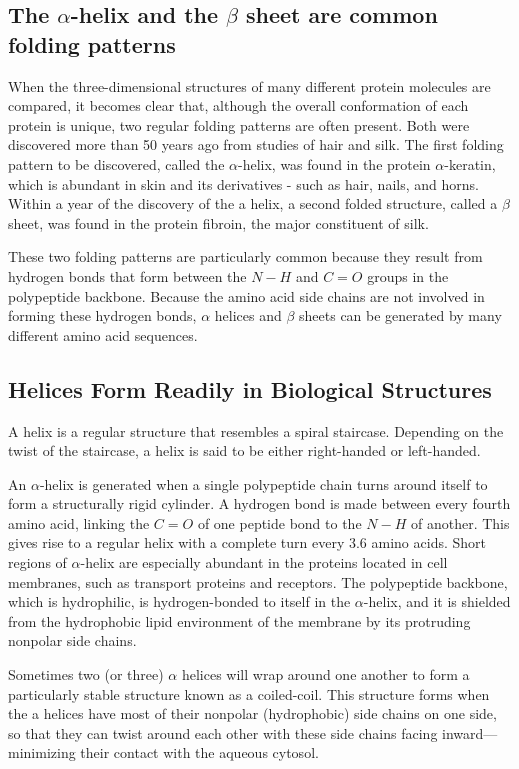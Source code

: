 \subsection{The $\alpha$-helix and the $\beta$ sheet are common folding patterns}

When the three-dimensional structures of many different protein molecules
are compared, it becomes clear that, although the overall
conformation of each protein is unique, two regular folding patterns are
often present. Both were discovered more than 50 years ago from studies
of hair and silk. The first folding pattern to be discovered, called the
$\alpha$-helix, was found in the protein $\alpha$-keratin, which is abundant in skin and
its derivatives - such as hair, nails, and horns. Within a year of the discovery
of the a helix, a second folded structure, called a $\beta$ sheet, was found
in the protein fibroin, the major constituent of silk.

These two folding patterns are particularly common because they result
from hydrogen bonds that form between the $N-H$ and $C=O$ groups in
the polypeptide backbone. Because the amino acid side chains are not
involved in forming these hydrogen bonds, $\alpha$ helices and $\beta$ sheets can
be generated by many different amino acid sequences.

\subsection{Helices Form Readily in Biological Structures}

A helix is a regular structure that resembles a spiral staircase.
Depending on the twist of the staircase, a helix is said to be either
right-handed or left-handed.

An $\alpha$-helix is generated when a single polypeptide chain turns around
itself to form a structurally rigid cylinder. A hydrogen bond is made
between every fourth amino acid, linking the $C=O$ of one peptide bond to
the $N-H$ of another. This gives rise to a regular helix
with a complete turn every 3.6 amino acids.
Short regions of $\alpha$-helix are especially abundant in the proteins located
in cell membranes, such as transport proteins and receptors.
The polypeptide backbone, which is hydrophilic, is hydrogen-bonded to itself in
the $\alpha$-helix, and it is shielded
from the hydrophobic lipid environment of the membrane by its protruding nonpolar side chains.

Sometimes two (or three) $\alpha$ helices will wrap around one another to
form a particularly stable structure known as a coiled-coil. This structure
forms when the a helices have most of their nonpolar (hydrophobic)
side chains on one side, so that they can twist around each other with
these side chains facing inward—minimizing their contact with the aqueous cytosol.

